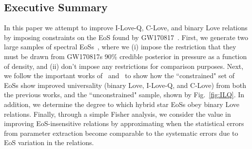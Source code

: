 \documentclass[prd,twocolumn,nofootinbib,superscriptaddress,amsmath,amssymb]{revtex4-1}
\begin{document}
\subsection{Executive Summary}
{}
In this paper we attempt to improve I-Love-Q, C-Love, and binary Love relations by imposing constraints on the EoS found by GW170817~\cite{LIGO:posterior,TheLIGOScientific:2017qsa}.
First, we generate two large samples of spectral EoSs~\cite{Lindblom:2018rfr}, where we (i) impose the restriction that they must be drawn from GW170817s 90\% credible posterior in pressure as a function of density, and (ii) don't impose any restrictions for comparison purposes.
Next, we follow the important works of~\cite{Yagi:binLove} and~\cite{Yagi:ILQ} to show how the ``constrained" set of EoSs show improved universality (binary Love, I-Love-Q, and C-Love) from both the previous works, and the ``unconstrained" sample, shown by Fig.~\ref{fig:ILQ}.
In addition, we determine the degree to which hybrid star EoSs obey binary Love relations.
Finally, through a simple Fisher analysis, we consider the value in improving EoS-insensitive relations by approximating when the statistical errors from parameter extraction become comparable to the systematic errors due to EoS variation in the relations.
\end{document}
